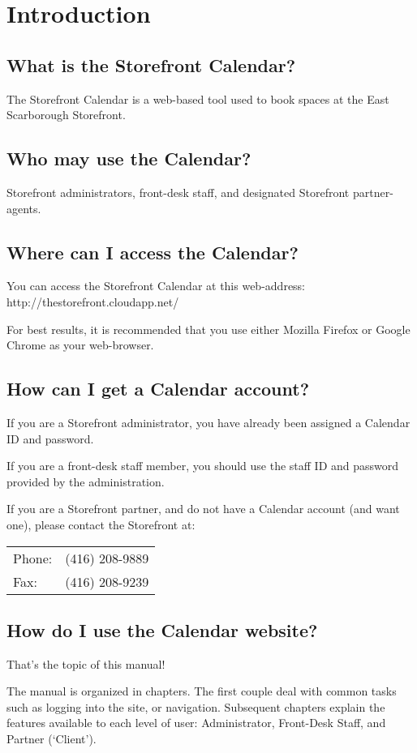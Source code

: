 \section*{Introduction}


\subsection*{What is the Storefront Calendar?}

The Storefront Calendar is a web-based tool used to book spaces at the East Scarborough Storefront.


\subsection*{Who may use the Calendar?}

Storefront administrators, front-desk staff, and designated Storefront partner-agents.


\subsection*{Where can I access the Calendar?}

You can access the Storefront Calendar at this web-address: http://thestorefront.cloudapp.net/

For best results, it is recommended that you use either Mozilla Firefox or Google Chrome as your web-browser.


\subsection*{How can I get a Calendar account?}

If you are a Storefront administrator, you have already been assigned a Calendar ID and password.

If you are a front-desk staff member, you should use the staff ID and password provided by the administration.

If you are a Storefront partner, and do not have a Calendar account (and want one), please contact the Storefront at:\newline\newline
\begin{tabular}{l l}
Phone: & (416) 208-9889 \\
Fax:   & (416) 208-9239 \\
\end{tabular}


\subsection*{How do I use the Calendar website?}

That's the topic of this manual!

The manual is organized in chapters. The first couple deal with common tasks such as logging into the site, or navigation. Subsequent chapters explain the features available to each level of user: Administrator, Front-Desk Staff, and Partner (`Client').




